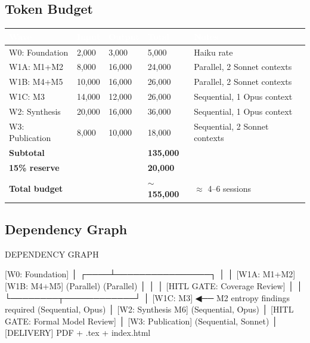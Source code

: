 \documentclass[11pt,letterpaper]{article}
\newcommand{\tableheader}[1]{\textbf{\sffamily\textcolor{white}{#1}}}
\begin{document}
\subsection{Token Budget}

\begin{center}
\begin{tabularx}{\textwidth}{L{3cm}C{2cm}C{2cm}C{2cm}X}
\toprule
{}
\tableheader{Wave} & \tableheader{Input} & \tableheader{Output} & \tableheader{Total} & \tableheader{Notes} \\
\midrule
W0: Foundation & 2,000 & 3,000 & 5,000 & Haiku rate \\
W1A: M1+M2 & 8,000 & 16,000 & 24,000 & Parallel, 2 Sonnet contexts \\
W1B: M4+M5 & 10,000 & 16,000 & 26,000 & Parallel, 2 Sonnet contexts \\
W1C: M3 & 14,000 & 12,000 & 26,000 & Sequential, 1 Opus context \\
W2: Synthesis & 20,000 & 16,000 & 36,000 & Sequential, 1 Opus context \\
W3: Publication & 8,000 & 10,000 & 18,000 & Sequential, 2 Sonnet contexts \\
\midrule
{}
\textbf{Subtotal} & & & \textbf{135,000} & \\
\textbf{15\% reserve} & & & \textbf{20,000} & \\
\textbf{Total budget} & & & \textbf{$\sim$155,000} & $\approx$ 4--6 sessions \\
\bottomrule
\end{tabularx}
\end{center}

\subsection{Dependency Graph}

\begin{asciibox}
DEPENDENCY GRAPH

  [W0: Foundation]
         │
    ┌────┴────────────────┐
    │                     │
  [W1A: M1+M2]        [W1B: M4+M5]
  (Parallel)          (Parallel)
    │                     │
    │            [HITL GATE: Coverage Review]
    │                     │
    └────────┬────────────┘
             │
       [W1C: M3]  ◀── M2 entropy findings required
       (Sequential, Opus)
             │
       [W2: Synthesis M6]
       (Sequential, Opus)
             │
    [HITL GATE: Formal Model Review]
             │
       [W3: Publication]
       (Sequential, Sonnet)
             │
         [DELIVERY]
         PDF + .tex + index.html
\end{asciibox}
\end{document}
